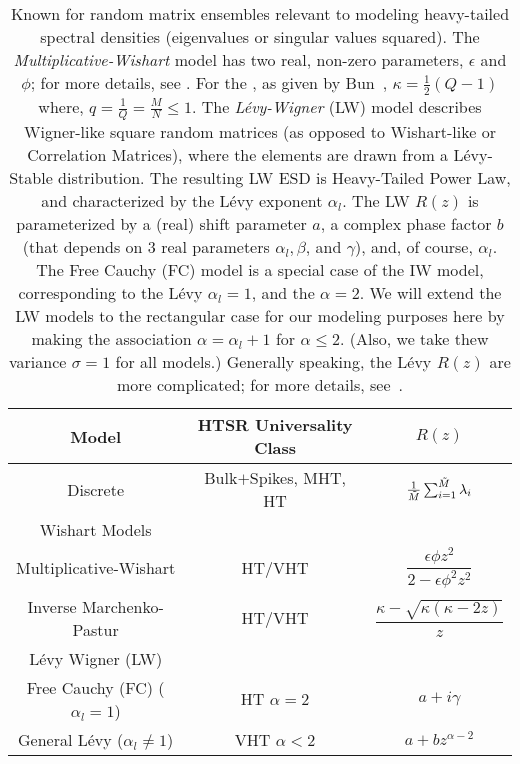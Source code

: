 \begin{table}[ht!]
  \centering
  \renewcommand{\arraystretch}{1.25} %
\begin{tabular}{|c|c|c|}
  \hline
  Model & \textbf{HTSR Universality Class} & \textbf{$R(z)$}\\  \hline
  \hline
  Discrete & Bulk$+$Spikes, MHT, HT & $\tfrac{1}{\tilde{M}}\sum_{i=1}^{\tilde{M}}\lambda_{i}$   \\ \hline
  \hline
  Wishart Models & &\\ \hline
  Multiplicative-Wishart & HT/VHT& $\dfrac{\epsilon\phi z^2}{2 - \epsilon\phi^2 z^2}$ \\  \hline
  Inverse Marchenko-Pastur & HT/VHT &  $\dfrac{\kappa-\sqrt{\kappa(\kappa-2z)}}{z}$   \\  \hline
  \hline
  L\'evy Wigner (LW) &   & \\  \hline
  Free Cauchy (FC) ($\alpha_{l}=1$) & HT $\alpha=2$ & $a+i\gamma$ \\ \hline
  General L\'evy  ($\alpha_{l}\ne 1$) & VHT $\alpha<2$   & $a+bz^{\alpha-2}$ \\  \hline
\end{tabular}
  \caption{Known \RTransforms for random matrix ensembles relevant to modeling heavy-tailed spectral densities (eigenvalues or singular values squared).
    The \emph{Multiplicative-Wishart} model has two real, non-zero parameters, $\epsilon$ and $\phi$; for more details,
    see \cite{PW16_NIPS}.
  For the \emph{\InverseMP}, as given by Bun~\cite{BunThesis}, $\kappa=\frac{1}{2}(Q-1)$ where, $q=\frac{1}{Q}=\frac{M}{N}\le 1$.
  The \emph{L\'evy-Wigner} (LW) model describes Wigner-like square random matrices
  (as opposed to Wishart-like or Correlation Matrices), where the elements are drawn from a L\'evy-Stable distribution.
  The resulting LW ESD is Heavy-Tailed Power Law, and characterized by the L\'evy exponent $\alpha_{l}$.
  The LW $R(z)$ is parameterized by a (real) shift parameter $a$,
  a complex phase factor $b$ (that depends on 3 real parameters   $\alpha_{l}, \beta$, and $\gamma$),
  and, of course, $\alpha_{l}$.
  The Free Cauchy (FC) model is a special case of the IW model, corresponding to the L\'evy $\alpha_{l}=1$, and the \HTSR $\alpha=2$. 
  We will extend the LW models to the rectangular case for our modeling purposes here by making
  the association   $\alpha = \alpha_{l}+1$ for $\alpha\le 2$.
   (Also, we take thew variance $\sigma=1$ for all models.)
   Generally speaking, the L\'evy $R(z)$ are more complicated; 
   for more details, see~\cite{BJNx01_TR,BJNx06_TR,BJ09_TR}.
}
\label{tab:known_r_transforms}
\end{table}

